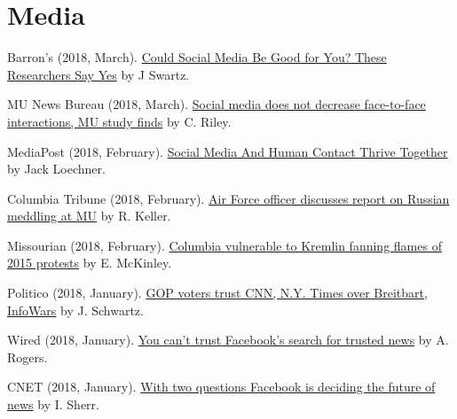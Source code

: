 \documentclass[11pt,letterpaper]{article}
\begin{document}
\section{Media}
  \begin{bibenum}
    \item[] Barron's (2018, March).
    \href{https://www.barrons.com/articles/could-social-media-be-good-for-you-these-researchers-say-yes-1519932207}{Could Social Media Be Good for You? These Researchers Say Yes} by J Swartz.

    \item[] MU News Bureau (2018, March).
    \href{https://munews.missouri.edu/news-releases/2018/0301-social-media-does-not-decrease-face-to-face-interactions-mu-study-finds/}{Social media does not decrease face-to-face interactions, MU study finds} by C. Riley.

    \item[] MediaPost (2018, February).
    \href{https://mediapost.com/publications/article/315106/social-media-and-human-contact-thrive-together.html}{Social Media And Human Contact Thrive Together} by Jack Loechner.

    \item[] Columbia Tribune (2018, February).
    \href{http://www.columbiatribune.com/news/20180217/air-force-officer-discusses-report-on-russian-meddling-at-mu}{Air Force officer discusses report on Russian meddling at MU} by R. Keller.

    \item[] Missourian (2018, February).
    \href{https://www.columbiamissourian.com/news/higher_education/columbia-vulnerable-to-kremlin-fanning-flames-of-protests/article_929cf366-11ad-11e8-9631-63ac0b4a6fd3.html}{Columbia vulnerable to Kremlin fanning flames of 2015 protests} by E. McKinley.

    \item[] Politico (2018, January).
    \href{https://www.politico.com/amp/story/2018/02/06/gop-republican-voters-media-bias-trusted-sites-393650}{ GOP voters trust CNN, N.Y. Times over Breitbart, InfoWars} by J. Schwartz.

  \item[] Wired (2018, January).
    \href{https://www.wired.com/story/you-cant-trust-facebooks-search-for-trusted-news/}{You
      can't trust Facebook's search for trusted news} by A. Rogers.

    \item[] CNET (2018, January).
  \href{https://www.cnet.com/news/with-two-questions-facebook-is-deciding-the-future-of-news-zuckerberg-fake-news/}{With
    two questions Facebook is deciding the future of news} by I. Sherr.

  \end{bibenum}
\end{document}

